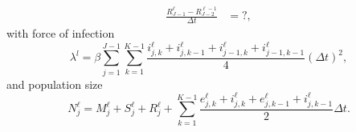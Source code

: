 \documentclass{jpmarticle}
\let\subequationsorig\subequations%
\let\endsubequationsorig\endsubequations%
\renewenvironment{subequations}{
  \subequationsorig
  \renewcommand{\theequation}{\theparentequation.\arabic{equation}}
}{
  \endsubequationsorig
}
\begin{document}
\begin{subequations}
\begin{align}
    \frac{R_{J - 1}^{\ell} - R_{J - 2}^{\ell - 1}}{\Delta t}
    &= ?,
  \end{align}
  with force of infection
  \begin{equation}
    \lambda^l =
    \beta
    \sum_{j = 1}^{J - 1}
    \sum_{k = 1}^{K - 1}
    \frac{i_{j, k}^{\ell}
      + i_{j, k - 1}^{\ell}
      + i_{j - 1, k}^{\ell}
      + i_{j - 1, k - 1}^{\ell}}
    {4}
    (\Delta t)^2,
  \end{equation}
  and population size
  \begin{equation}
    N_j^{\ell} =
    M_j^{\ell} + S_j^{\ell} + R_j^{\ell}
    + \sum_{k = 1}^{K - 1}
    \frac{e_{j, k}^{\ell} + i_{j, k}^{\ell}
      + e_{j, k - 1}^{\ell} + i_{j, k - 1}^{\ell}}
    {2}
    \Delta t.
  \end{equation}
\end{subequations}


\printbibliography
\end{document}

